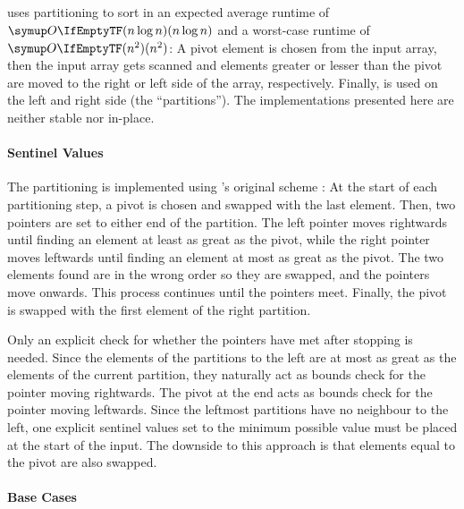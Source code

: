 \subsection{\texorpdfstring{\QS{}}{QuickSort}}
\label{subsec:tasklet:quick}


\QS{} \cite{hoare1962quicksort} uses partitioning to sort in an expected average runtime of \(\bigoh{n \log n}\) and a worst-case runtime of \(\bigoh{n^2}\):
A pivot element is chosen from the input array, then the input array gets scanned and elements greater or lesser than the pivot are moved to the right or left side of the array, respectively.
Finally, \QS{} is used on the left and right side (the \enquote{partitions}).
The \QS*{} implementations presented here are neither stable nor in-place.


\paragraph{Sentinel Values}
The partitioning is implemented using \citeauthor{hoare1962quicksort}'s original scheme \cite{hoare1962quicksort}:
At the start of each partitioning step, a pivot is chosen and swapped with the last element.
Then, two pointers are set to either end of the partition.
The left pointer moves rightwards until finding an element at least as great as the pivot, while the right pointer moves leftwards until finding an element at most as great as the pivot.
The two elements found are in the wrong order so they are swapped, and the pointers move onwards.
This process continues until the pointers meet.
Finally, the pivot is swapped with the first element of the right partition.

Only an explicit check for whether the pointers have met after stopping is needed.
Since the elements of the partitions to the left are at most as great as the elements of the current partition, they naturally act as bounds check for the pointer moving rightwards.
The pivot at the end acts as bounds check for the pointer moving leftwards.
Since the leftmost partitions have no neighbour to the left, one explicit sentinel values set to the minimum possible value must be placed at the start of the input.
The downside to this approach is that elements equal to the pivot are also swapped.

\paragraph{Base Cases}

